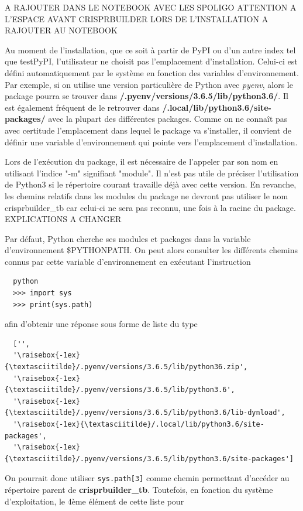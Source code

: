 \documentclass[twoside,a4paper,11pt,frenchb,openany]{report}
\begin{document}
A RAJOUTER DANS LE NOTEBOOK AVEC LES SPOLIGO
ATTENTION A L'ESPACE AVANT CRISPRBUILDER LORS DE L'INSTALLATION A RAJOUTER AU NOTEBOOK

Au moment de l'installation, que ce soit à partir de PyPI ou d'un autre index tel que
testPyPI, l'utilisateur ne choisit pas l'emplacement d'installation. Celui-ci est défini automatiquement par le système en fonction des variables d'environnement. Par exemple, si on utilise une version particulière de Python avec \textit{pyenv}, alors le package pourra se trouver dans \textbf{\raisebox{-1ex}{\textasciitilde}/.pyenv/versions/3.6.5/lib/python3.6/}. Il est également fréquent de le retrouver dans \textbf{\raisebox{-1ex}{\textasciitilde}/.local/lib/python3.6/site-packages/} avec la plupart des différentes packages. Comme on ne connaît pas avec certitude l'emplacement dans lequel le package va s'installer, il convient de définir une variable d'environnement qui pointe vers l'emplacement d'installation.

Lors de l'exécution du package, il est nécessaire de l'appeler par son nom en utilisant l'indice "-m" signifiant "module". Il n'est pas utile de préciser l'utilisation de Python3 si le répertoire courant travaille déjà avec cette version. En revanche, les chemins relatifs dans les modules du package ne devront pas utiliser le nom crisprbuilder\_tb car celui-ci ne sera pas reconnu, une fois à la racine du package. EXPLICATIONS A CHANGER

Par défaut, Python cherche ses modules et packages dans la variable d'environnement \$PYTHONPATH. On peut alors consulter les différents chemins connus par cette variable d'environnement en exécutant l'instruction
\begin{verbatim}  python
  >>> import sys
  >>> print(sys.path)\end{verbatim}

afin d'obtenir une réponse sous forme de liste du type
\begin{verbatim}  ['',
  '\raisebox{-1ex}{\textasciitilde}/.pyenv/versions/3.6.5/lib/python36.zip',
  '\raisebox{-1ex}{\textasciitilde}/.pyenv/versions/3.6.5/lib/python3.6',
  '\raisebox{-1ex}{\textasciitilde}/.pyenv/versions/3.6.5/lib/python3.6/lib-dynload',    
  '\raisebox{-1ex}{\textasciitilde}/.local/lib/python3.6/site-packages',
  '\raisebox{-1ex}{\textasciitilde}/.pyenv/versions/3.6.5/lib/python3.6/site-packages']\end{verbatim}

On pourrait donc utiliser \texttt{sys.path[3]} comme chemin permettant d'accéder au répertoire parent de \textbf{crisprbuilder\_tb}. Toutefois, en fonction du système d'exploitation,  le 4ème élément de cette liste pour
\end{document}
